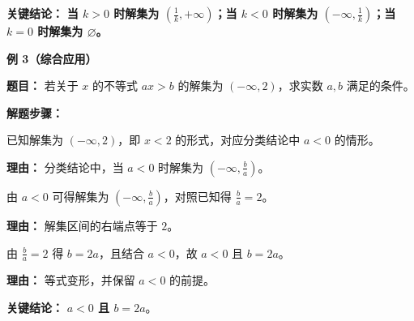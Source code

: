 \begin{examplebox}
	\textbf{\textcolor{CExample}{关键结论：}}
	\textbf{当 $k>0$ 时解集为 $\left(\frac{1}{k}, +\infty\right)$；当 $k<0$ 时解集为 $\left(-\infty, \frac{1}{k}\right)$；当 $k=0$ 时解集为 $\varnothing$。}

	\medskip
	\textbf{\textcolor{CExample}{例 3（综合应用）}}

	\textbf{\textcolor{CExample}{题目：}}
	若关于 $x$ 的不等式 $ax > b$ 的解集为 $(-\infty, 2)$，求实数 $a,b$ 满足的条件。

	\textbf{\textcolor{CExample}{解题步骤：}}
	\begin{description}[style=nextline, leftmargin=2.8em, labelsep=0.5em, itemsep=0.45em]
		\item[\textbf{第一步（解集特征分析）：}] 已知解集为 $(-\infty,2)$，即 $x<2$ 的形式，对应分类结论中 $a<0$ 的情形。
			\par\textbf{理由：} 分类结论中，当 $a<0$ 时解集为 $\left(-\infty, \frac{b}{a}\right)$。
		\item[\textbf{第二步（等量关系建立）：}] 由 $a<0$ 可得解集为 $\left(-\infty, \frac{b}{a}\right)$，对照已知得 $\frac{b}{a}=2$。
			\par\textbf{理由：} 解集区间的右端点等于 $2$。
		\item[\textbf{第三步（条件表达）：}] 由 $\frac{b}{a}=2$ 得 $b=2a$，且结合 $a<0$，故 $a<0$ 且 $b=2a$。
			\par\textbf{理由：} 等式变形，并保留 $a<0$ 的前提。
	\end{description}

	\textbf{\textcolor{CExample}{关键结论：}}
	\textbf{$a<0$ 且 $b=2a$}。
\end{examplebox}
